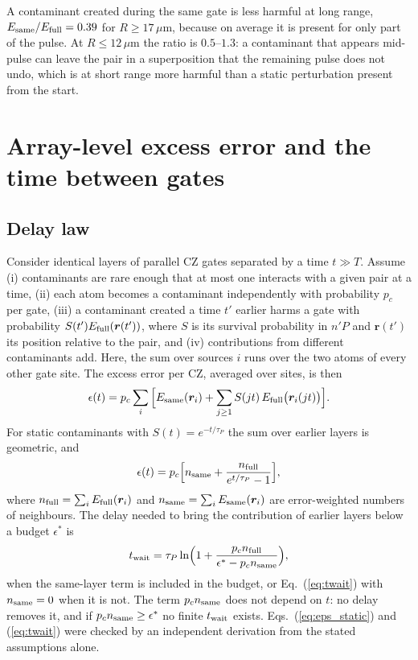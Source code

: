 \documentclass[aps,pra,twocolumn,superscriptaddress,longbibliography,floatfix]{revtex4-2}
\newcommand{\um}{\,\mu\mathrm{m}}
\begin{document}
A contaminant created during the same gate is less harmful at long range, $E_{\rm same}/E_{\rm full}=0.39$ for $R\ge17\um$, because on average it is present for only part of the pulse. At $R\le12\um$ the ratio is $0.5$--$1.3$: a contaminant that appears mid-pulse can leave the pair in a superposition that the remaining pulse does not undo, which is at short range more harmful than a static perturbation present from the start.

\section{Array-level excess error and the time between gates}
\label{sec:array}

\subsection{Delay law}

Consider identical layers of parallel CZ gates separated by a time $t\gg T$. Assume (i) contaminants are rare enough that at most one interacts with a given pair at a time, (ii) each atom becomes a contaminant independently with probability $p_c$ per gate, (iii) a contaminant created a time $t'$ earlier harms a gate with probability $S(t')E_{\rm full}(\bm r(t'))$, where $S$ is its survival probability in $n'P$ and $\bm r(t')$ its position relative to the pair, and (iv) contributions from different contaminants add. Here, the sum over sources $i$ runs over the two atoms of every other gate site. The excess error per CZ, averaged over sites, is then
\begin{equation}
\epsilon(t)=p_c\sum_i\Big[E_{\rm same}(\bm r_i)+\sum_{j\ge1}S(jt)\,E_{\rm full}\big(\bm r_i(jt)\big)\Big].
\label{eq:eps}
\end{equation}
For static contaminants with $S(t)=e^{-t/\tau_P}$ the sum over earlier layers is geometric, and
\begin{equation}
\epsilon(t)=p_c\Big[n_{\rm same}+\frac{n_{\rm full}}{e^{t/\tau_P}-1}\Big],
\label{eq:eps_static}
\end{equation}
where $n_{\rm full}=\sum_iE_{\rm full}(\bm r_i)$ and $n_{\rm same}=\sum_iE_{\rm same}(\bm r_i)$ are error-weighted numbers of neighbours. The delay needed to bring the contribution of earlier layers below a budget $\epsilon^*$ is
\begin{equation}
t_{\rm wait}=\tau_P\ln\!\Big(1+\frac{p_cn_{\rm full}}{\epsilon^*-p_cn_{\rm same}}\Big),
\label{eq:twait}
\end{equation}
when the same-layer term is included in the budget, or Eq.~(\ref{eq:twait}) with $n_{\rm same}=0$ when it is not. The term $p_cn_{\rm same}$ does not depend on $t$: no delay removes it, and if $p_cn_{\rm same}\ge\epsilon^*$ no finite $t_{\rm wait}$ exists. Eqs.~(\ref{eq:eps_static}) and (\ref{eq:twait}) were checked by an independent derivation from the stated assumptions alone.
\end{document}
